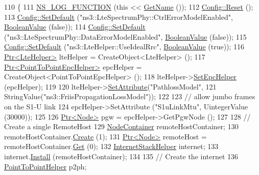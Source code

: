 \begin{DoxyCode}
110 \{
111   \hyperlink{log-macros-disabled_8h_a90b90d5bad1f39cb1b64923ea94c0761}{NS\_LOG\_FUNCTION} (\textcolor{keyword}{this} << \hyperlink{classns3_1_1TestCase_a28f7bb59669c24dae1c290fc17fc9b62}{GetName} ());
112   \hyperlink{group__config_ga2c1b65724f42f8c72276d7e7ad6df6db}{Config::Reset} ();
113   \hyperlink{group__config_ga2e7882df849d8ba4aaad31c934c40c06}{Config::SetDefault} (\textcolor{stringliteral}{"ns3::LteSpectrumPhy::CtrlErrorModelEnabled"}, 
      \hyperlink{classns3_1_1BooleanValue}{BooleanValue} (\textcolor{keyword}{false}));
114   \hyperlink{group__config_ga2e7882df849d8ba4aaad31c934c40c06}{Config::SetDefault} (\textcolor{stringliteral}{"ns3::LteSpectrumPhy::DataErrorModelEnabled"}, 
      \hyperlink{classns3_1_1BooleanValue}{BooleanValue} (\textcolor{keyword}{false}));  
115   \hyperlink{group__config_ga2e7882df849d8ba4aaad31c934c40c06}{Config::SetDefault} (\textcolor{stringliteral}{"ns3::LteHelper::UseIdealRrc"}, 
      \hyperlink{classns3_1_1BooleanValue}{BooleanValue} (\textcolor{keyword}{true}));
116   \hyperlink{classns3_1_1Ptr}{Ptr<LteHelper>} lteHelper = CreateObject<LteHelper> ();
117   \hyperlink{classns3_1_1Ptr}{Ptr<PointToPointEpcHelper>} epcHelper = CreateObject<PointToPointEpcHelper> ();
118   lteHelper->\hyperlink{classns3_1_1LteHelper_a324079a1ccd54ce949786b83d6b95915}{SetEpcHelper} (epcHelper);
119 
120   lteHelper->\hyperlink{classns3_1_1ObjectBase_ac60245d3ea4123bbc9b1d391f1f6592f}{SetAttribute}(\textcolor{stringliteral}{"PathlossModel"},
121                           StringValue(\textcolor{stringliteral}{"ns3::FriisPropagationLossModel"}));
122 
123   \textcolor{comment}{// allow jumbo frames on the S1-U link}
124   epcHelper->SetAttribute (\textcolor{stringliteral}{"S1uLinkMtu"}, UintegerValue (30000));
125 
126   \hyperlink{classns3_1_1Ptr}{Ptr<Node>} pgw = epcHelper->GetPgwNode ();
127   
128   \textcolor{comment}{// Create a single RemoteHost}
129   \hyperlink{classns3_1_1NodeContainer}{NodeContainer} remoteHostContainer;
130   remoteHostContainer.\hyperlink{classns3_1_1NodeContainer_a787f059e2813e8b951cc6914d11dfe69}{Create} (1);
131   \hyperlink{classns3_1_1Ptr}{Ptr<Node>} remoteHost = remoteHostContainer.\hyperlink{classns3_1_1NodeContainer_a9ed96e2ecc22e0f5a3d4842eb9bf90bf}{Get} (0);
132   \hyperlink{classns3_1_1InternetStackHelper}{InternetStackHelper} internet;
133   internet.\hyperlink{classns3_1_1InternetStackHelper_a6645b412f31283d2d9bc3d8a95cebbc0}{Install} (remoteHostContainer);
134 
135   \textcolor{comment}{// Create the internet}
136   \hyperlink{classns3_1_1PointToPointHelper}{PointToPointHelper} p2ph;

\end{DoxyCode}
